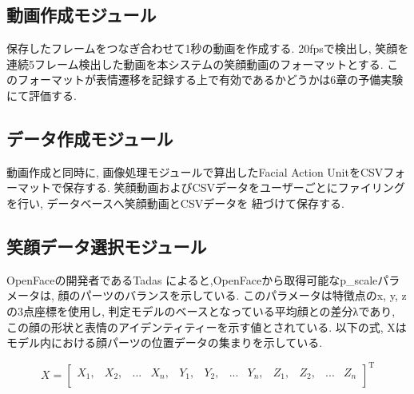 \subsection{動画作成モジュール}
保存したフレームをつなぎ合わせて1秒の動画を作成する.
20fpsで検出し, 笑顔を連続5フレーム検出した動画を本システムの笑顔動画のフォーマットとする.
このフォーマットが表情遷移を記録する上で有効であるかどうかは6章の予備実験にて評価する.

\subsection{データ作成モジュール}
動画作成と同時に, 画像処理モジュールで算出したFacial Action UnitをCSVフォーマットで保存する.
笑顔動画およびCSVデータをユーザーごとにファイリングを行い, データベースへ笑顔動画とCSVデータを
紐づけて保存する.

\subsection{笑顔データ選択モジュール}
OpenFaceの開発者であるTadas \cite{tadas} によると,OpenFaceから取得可能なp\_scaleパラメータは,
顔のパーツのバランスを示している.
このパラメータは特徴点のx, y, zの3点座標を使用し, 判定モデルのベースとなっている平均顔との差分λであり,
この顔の形状と表情のアイデンティティーを示す値とされている.
以下の式, Xはモデル内における顔パーツの位置データの集まりを示している.

\begin{equation}
  X =
  \left[
  \begin{array}{cccccccccccc}
  X_1, & X_2, & ... & X_n, & Y_1, & Y_2, & ... & Y_n, & Z_1, & Z_2, & ... & Z_n \\
  \end{array}
  \right]
  ^{\mathrm{T}}
\end{equation}


